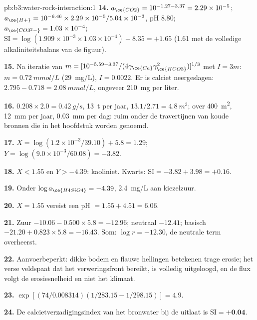\begin{solution}{pb:b3:water-rock-interaction:1}
\textbf{14.} $a_{\ce{CO2}} = 10^{-1.27 - 3.37} = 2.29\times10^{-5}$;
$a_{\ce{H+}} = 10^{-6.46}\times2.29\times10^{-5}/5.04\times10^{-3}$, pH 8.80;
$a_{\ce{CO3^2-}} = 1.03\times10^{-4}$; $\mathrm{SI} = \log(1.909\times
10^{-3}\times1.03\times10^{-4}) + 8.35 = +1.65$ (1.61 met de volledige
alkaliniteitsbalans van de figuur).

\textbf{15.} Na iteratie van $m = [10^{-5.59 - 3.37}/(4\gamma_{\ce{Ca}}
\gamma_{\ce{HCO3}}^2)]^{1/3}$ met $I = 3m$: $m = \qty{0.72}{mmol/L}$
(\qty{29}{mg/L}), $I = 0.0022$. Er is calciet neergeslagen: $2.795 - 0.718 =
\qty{2.08}{mmol/L}$, ongeveer \qty{210}{mg} per liter.

\textbf{16.} $0.208\times2.0 = \qty{0.42}{g/s}$, \qty{13}{t} per jaar,
$13.1/2.71 = \qty{4.8}{m^3}$; over \qty{400}{m^2}, \qty{12}{mm} per jaar,
\qty{0.03}{mm} per dag: ruim onder de travertijnen van koude bronnen die in het hoofdstuk worden genoemd.

\textbf{17.} $X = \log(1.2\times10^{-3}/39.10) + 5.8 = 1.29$; $Y =
\log(9.0\times10^{-3}/60.08) = -3.82$.

\textbf{18.} $X < 1.55$ en $Y > -4.39$: kaoliniet. Kwarts: $\mathrm{SI} =
-3.82 + 3.98 = +0.16$.

\textbf{19.} Onder $\log a_{\ce{H4SiO4}} = -4.39$, \qty{2.4}{mg/L} aan
kiezelzuur.

\textbf{20.} $X = 1.55$ vereist een pH $= 1.55 + 4.51 = 6.06$.

\textbf{21.} Zuur $-10.06 - 0.500\times5.8 = -12.96$; neutraal $-12.41$; basisch
$-21.20 + 0.823\times5.8 = -16.43$. Som: $\log r = -12.30$, de neutrale term
overheerst.

\textbf{22.} Aanvoerbeperkt: dikke bodem en flauwe hellingen betekenen trage erosie;
het verse veldspaat dat het verweringsfront bereikt, is volledig uitgeloogd, en
de flux volgt de erosiesnelheid en niet het klimaat.

\textbf{23.} $\exp[(74/0.008314)(1/283.15 - 1/298.15)] = 4.9$.

\textbf{24.} De calcietverzadigingsindex van het bronwater bij de uitlaat
is $\mathrm{SI} = \textbf{+0.04}$.
\end{solution}
